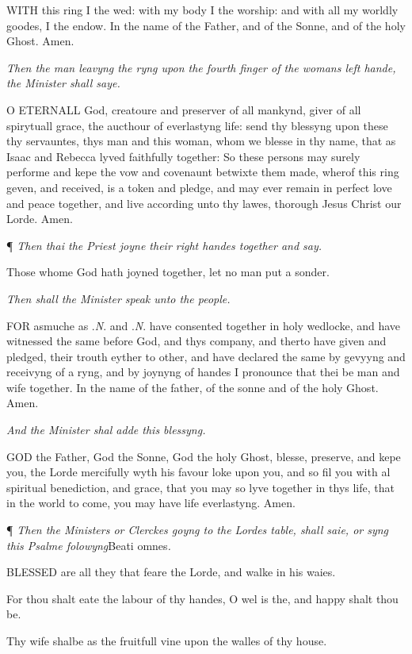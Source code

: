 WITH
this ring I the wed: with my body I the worship: and with all my worldly
goodes, I the endow. In the name of the Father, and of the Sonne, and
of the holy Ghost. Amen.

\emph{Then
the man leavyng the ryng upon the fourth finger of the womans left hande,
the Minister shall saye.}

O
ETERNALL God, creatoure and preserver of all mankynd, giver of all spirytuall
grace, the aucthour of everlastyng life: send thy blessyng upon these
thy servauntes, thys man and this woman, whom we blesse in thy name, that
as Isaac and Rebecca lyved faithfully together: So these persons may surely
performe and kepe the vow and covenaunt betwixte them made, wherof this
ring geven, and received, is a token and pledge, and may ever remain in
perfect love and peace together, and live according unto thy lawes, thorough
Jesus Christ our Lorde. Amen.

¶
\emph{Then thai the Priest joyne their right handes together and say.}

Those whome God hath joyned together, let no man put a sonder.

\emph{Then
shall the Minister speak unto the people.}

FOR
asmuche as .\emph{N}. and .\emph{N}. have consented together in holy wedlocke,
and have witnessed the same before God, and thys company, and therto have
given and pledged, their trouth eyther to other, and have declared the
same by gevyyng and receivyng of a ryng, and by joynyng of handes I pronounce
that thei be man and wife together. In the name of the father, of the
sonne and of the holy Ghost. Amen.

\emph{And
the Minister shal adde this blessyng.}

GOD
the Father, God the Sonne, God the holy Ghost, blesse, preserve, and kepe
you, the Lorde mercifully wyth his favour loke upon you, and so fil you
with al spiritual benediction, and grace, that you may so lyve together
in thys life, that in the world to come, you may have life everlastyng.
Amen.

¶
\emph{Then the Ministers or Clerckes goyng to the Lordes table, shall saie,
or syng this Psalme folowyng}Beati omnes\emph{.}

BLESSED
are all they that feare the Lorde, and walke in his waies.

For thou shalt eate the labour of thy handes, O wel
is the, and happy shalt thou be.

Thy wife shalbe as the fruitfull vine upon the walles
of thy house.

